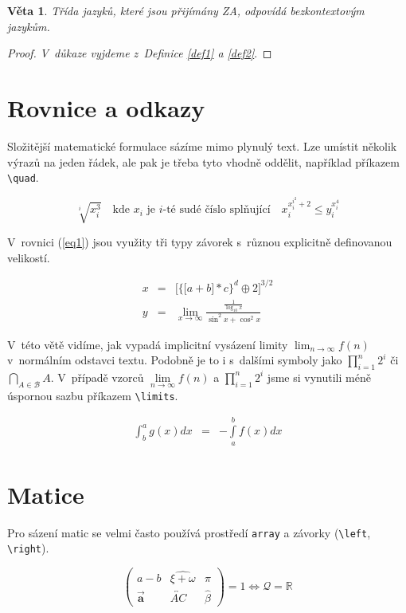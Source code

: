 \documentclass[a4paper, twocolumn, 11pt]{article}
\newtheorem{sentence}{Věta}
\begin{document}
\begin{sentence}
    Třída jazyků, které jsou přijímány ZA, odpovídá \emph{bezkontextovým jazykům}.
\end{sentence}
\begin{proof}
    \emph{V~důkaze vyjdeme z~Definice \ref{def1} a \ref{def2}}.
\end{proof}

\section{Rovnice a odkazy}

Složitější matematické formulace sázíme mimo plynulý text. 
Lze umístit několik výrazů na jeden řádek, ale pak je třeba tyto vhodně oddělit, například příkazem \verb|\quad|.


$$\sqrt[i]{x_i^3}\quad\text{kde } x_i \text{ je } i\text{-té sudé číslo splňující}\quad x_i^{x_i^{i^2}+2} \leq y_i^{x_i^4}$$

V~rovnici (\ref{eq1}) jsou využity tři typy závorek s~různou explicitně definovanou velikostí.

\begin{eqnarray}
\label{eq1} x & = & \bigg[\Big\{\big[a+b\big]*c\Big\}^d\oplus 2\bigg]^{3/2}\\
    y & = & \lim_{x\to\infty} \frac{\frac{1}{\log_{10}x}}{\sin^2{x} + \cos^2{x}} \nonumber
\end{eqnarray}

V~této větě vidíme, jak vypadá implicitní vysázení limity $\lim_{n\to\infty} f(n)$ 
v~normálním odstavci textu. Podobně je to i s~dalšími symboly jako 
$\prod_{i=1}^{n}2^i$ či $\bigcap_{A\in \mathcal{B}}A$. V~případě vzorců $\lim\limits_{n\to\infty} f(n)$ a  $\prod\limits_{i=1}^{n}2^i$ 
jsme si vynutili méně úspornou sazbu příkazem \verb|\limits|.

\begin{eqnarray}
    \int_{b}^{a} g(x)dx & = & - \int\limits_{a}^{b} f(x)dx
\end{eqnarray}

\section{Matice}

Pro sázení matic se velmi často používá prostředí \texttt{array} a závorky (\verb|\left|, \verb|\right|).


$$
\left( \begin{array}{ccc}
a-b & \widehat{\xi+\omega} & \pi \\
\vec{\mathbf{a}} & \overleftrightarrow{AC} & \hat{\beta} 
\end{array} \right) = 1 \Longleftrightarrow \mathcal{Q} = \mathbb{R}
$$
\end{document}
